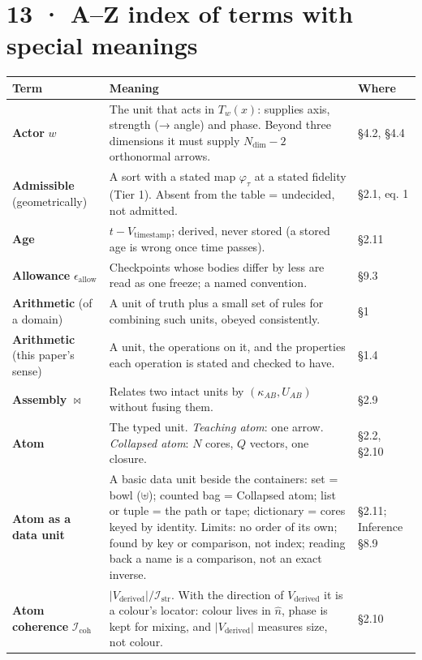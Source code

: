 \documentclass[10.5pt]{article}
\begin{document}
\section*{13 · A–Z index of terms with special meanings}
{\small\setlength{\tabcolsep}{4pt}\begin{longtable}{L{3.6cm}L{10.9cm}L{1.8cm}}
\toprule
\textbf{Term} & \textbf{Meaning} & \textbf{Where} \\
\midrule
\endhead
\textbf{Actor} $w$ & The unit that acts in $T_w(x)$: supplies axis, strength (→ angle) and phase. Beyond three dimensions it must supply $N_{\mathrm{dim}}-2$ orthonormal arrows. & §4.2, §4.4 \\
\textbf{Admissible} (geometrically) & A sort with a stated map $\varphi_\tau$ at a stated fidelity (Tier 1). Absent from the table = undecided, not admitted. & §2.1, eq. 1 \\
\textbf{Age} & $t-V_{\text{timestamp}}$; derived, never stored (a stored age is wrong once time passes). & §2.11 \\
\textbf{Allowance} $\epsilon_{\text{allow}}$ & Checkpoints whose bodies differ by less are read as one freeze; a named convention. & §9.3 \\
\textbf{Arithmetic} (of a domain) & A unit of truth plus a small set of rules for combining such units, obeyed consistently. & §1 \\
\textbf{Arithmetic} (this paper's sense) & A unit, the operations on it, and the properties each operation is stated and checked to have. & §1.4 \\
\textbf{Assembly} $\bowtie$ & Relates two intact units by $(\kappa_{AB},U_{AB})$ without fusing them. & §2.9 \\
\textbf{Atom} & The typed unit. \emph{Teaching atom}: one arrow. \emph{Collapsed atom}: $N$ cores, $Q$ vectors, one closure. & §2.2, §2.10 \\
\textbf{Atom as a data unit} & A basic data unit beside the containers: set = bowl ($\uplus$); counted bag = Collapsed atom; list or tuple = the path or tape; dictionary = cores keyed by identity. Limits: no order of its own; found by key or comparison, not index; reading back a name is a comparison, not an exact inverse. & §2.11; Inference §8.9 \\
\textbf{Atom coherence} $\mathcal{I}_{\mathrm{coh}}$ & $\lvert V_{\text{derived}}\rvert/\mathcal{I}_{\mathrm{str}}$. With the direction of $V_{\text{derived}}$ it is a colour's locator: colour lives in $\hat n$, phase is kept for mixing, and $\lvert V_{\text{derived}}\rvert$ measures size, not colour. & §2.10 \\

\end{longtable}}
\end{document}

